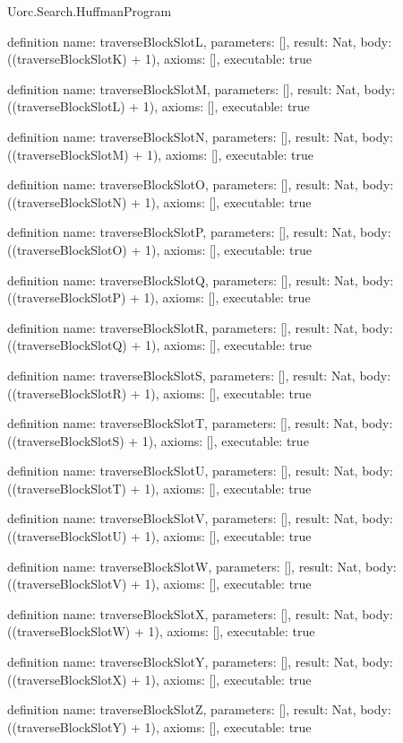 \begin{lexlean}{Uorc.Search.HuffmanProgram}
\begin{semanticmodule}
definition{
  name: traverseBlockSlotL,
  parameters: [],
  result: Nat,
  body: ((traverseBlockSlotK) + 1),
  axioms: [],
  executable: true
}

definition{
  name: traverseBlockSlotM,
  parameters: [],
  result: Nat,
  body: ((traverseBlockSlotL) + 1),
  axioms: [],
  executable: true
}

definition{
  name: traverseBlockSlotN,
  parameters: [],
  result: Nat,
  body: ((traverseBlockSlotM) + 1),
  axioms: [],
  executable: true
}

definition{
  name: traverseBlockSlotO,
  parameters: [],
  result: Nat,
  body: ((traverseBlockSlotN) + 1),
  axioms: [],
  executable: true
}

definition{
  name: traverseBlockSlotP,
  parameters: [],
  result: Nat,
  body: ((traverseBlockSlotO) + 1),
  axioms: [],
  executable: true
}

definition{
  name: traverseBlockSlotQ,
  parameters: [],
  result: Nat,
  body: ((traverseBlockSlotP) + 1),
  axioms: [],
  executable: true
}

definition{
  name: traverseBlockSlotR,
  parameters: [],
  result: Nat,
  body: ((traverseBlockSlotQ) + 1),
  axioms: [],
  executable: true
}

definition{
  name: traverseBlockSlotS,
  parameters: [],
  result: Nat,
  body: ((traverseBlockSlotR) + 1),
  axioms: [],
  executable: true
}

definition{
  name: traverseBlockSlotT,
  parameters: [],
  result: Nat,
  body: ((traverseBlockSlotS) + 1),
  axioms: [],
  executable: true
}

definition{
  name: traverseBlockSlotU,
  parameters: [],
  result: Nat,
  body: ((traverseBlockSlotT) + 1),
  axioms: [],
  executable: true
}

definition{
  name: traverseBlockSlotV,
  parameters: [],
  result: Nat,
  body: ((traverseBlockSlotU) + 1),
  axioms: [],
  executable: true
}

definition{
  name: traverseBlockSlotW,
  parameters: [],
  result: Nat,
  body: ((traverseBlockSlotV) + 1),
  axioms: [],
  executable: true
}

definition{
  name: traverseBlockSlotX,
  parameters: [],
  result: Nat,
  body: ((traverseBlockSlotW) + 1),
  axioms: [],
  executable: true
}

definition{
  name: traverseBlockSlotY,
  parameters: [],
  result: Nat,
  body: ((traverseBlockSlotX) + 1),
  axioms: [],
  executable: true
}

definition{
  name: traverseBlockSlotZ,
  parameters: [],
  result: Nat,
  body: ((traverseBlockSlotY) + 1),
  axioms: [],
  executable: true
}


\end{semanticmodule}
\end{lexlean}
